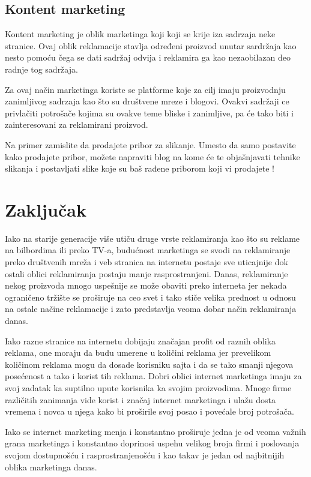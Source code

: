 \documentclass[a4paper]{article}
\begin{document}
{\subsection{Kontent marketing  }
\label{subsec:Kontent marketing}
Kontent marketing je oblik marketinga koji koji se krije iza sadrzaja neke stranice. Ovaj oblik reklamacije stavlja određeni proizvod unutar sardržaja kao nesto pomoću čega se dati sadržaj odvija i reklamira ga kao nezaobilazan deo radnje tog sadržaja. 

Za ovaj način marketinga koriste se platforme koje za cilj imaju proizvodnju zanimljivog sadrzaja kao što su društvene mreze i blogovi. Ovakvi sadržaji ce privlačiti potrošače kojima su ovakve teme bliske i zanimljive, pa će tako biti i zainteresovani za reklamirani proizvod. 

Na  primer zamislite da prodajete pribor za slikanje. Umesto da samo postavite kako prodajete pribor, možete napraviti blog na kome će te objašnjavati tehnike slikanja i postavljati slike koje su baš rađene priborom koji vi prodajete
\cite{elementi}
\cite{hollistic}!

\section{Zaključak}
\label{sec:zakljucak}
Iako na starije generacije više utiču druge vrste reklamiranja kao što su reklame na bilbordima ili preko TV-a, budućnost marketinga se svodi na reklamiranje preko društvenih mreža i veb stranica na internetu postaje sve uticajnije dok ostali oblici reklamiranja postaju manje rasprostranjeni. Danas, reklamiranje nekog proizvoda mnogo uspešnije se može obaviti preko interneta jer nekada ograničeno tržište se proširuje na ceo svet i tako stiče velika prednost u odnosu na ostale načine reklamacije i zato predstavlja veoma dobar način reklamiranja danas.

Iako razne stranice na internetu dobijaju značajan profit od raznih oblika reklama, one moraju da budu umerene u količini reklama jer prevelikom količinom reklama mogu da dosade korisniku sajta i da se tako smanji njegova posećenost a tako i korist tih reklama. Dobri oblici internet marketinga imaju za svoj zadatak ka suptilno  upute korisnika ka svojim proizvodima. Mnoge firme različitih zanimanja vide korist i značaj internet marketinga i ulažu dosta vremena i novca u njega kako bi proširile svoj posao i povećale broj potrošača. 

Iako se internet marketing menja i konstantno proširuje jedna je od veoma važnih grana marketinga i konstantno doprinosi uspehu velikog broja firmi i poslovanja svojom dostupnošću i rasprostranjenošću i kao takav je jedan od najbitnijih oblika marketinga danas.
\appendix

}
\end{document}
